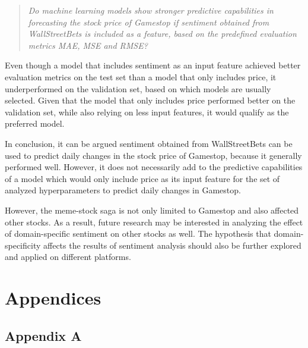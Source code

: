 \documentclass[11pt, a4paper]{article}
\begin{document}
\begin{quote}
    \emph{Do machine learning models show stronger predictive capabilities in forecasting the stock price of Gamestop if sentiment obtained from WallStreetBets is included as a feature, based on the predefined evaluation metrics MAE, MSE and RMSE?}
\end{quote}

Even though a model that includes sentiment as an input feature achieved better evaluation metrics on the test set than a model that only includes price,
it underperformed on the validation set, based on which models are usually selected.
Given that the model that only includes price performed better on the validation set, while also relying on less input features, it
would qualify as the preferred model.

In conclusion, it can be argued sentiment obtained from WallStreetBets can be used to predict daily changes in the stock price
of Gamestop, because it generally performed well. However, it
does not necessarily add to the predictive capabilities of a model which would only include price as its input feature for the set
of analyzed hyperparameters to predict daily changes in Gamestop.

However, the meme-stock saga is not only limited to Gamestop and also affected other stocks.
As a result, future research may be interested in analyzing the effect of domain-specific sentiment on other stocks as well.
The hypothesis that domain-specificity affects the results of sentiment analysis should also be further explored and applied
on different platforms.


\pagebreak
\section{Appendices}

\subsection{Appendix A}
\label{appendix:A}
\end{document}
